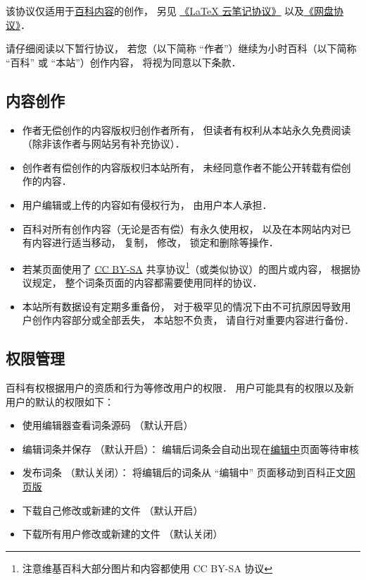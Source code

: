 
该协议仅适用于\href{http://wuli.wiki/online/}{百科内容}的创作， 另见 \href{http://wuli.wiki/online/NtLcns.html}{《LaTeX 云笔记协议》} 以及\href{http://www.example.com}{《网盘协议》}．

请仔细阅读以下暂行协议， 若您（以下简称 “作者”）继续为小时百科（以下简称 “百科” 或 “本站”）创作内容， 将视为同意以下条款．

\subsection{内容创作}
\begin{itemize}
\item 作者无偿创作的内容版权归创作者所有， 但读者有权利从本站永久免费阅读（除非该作者与网站另有补充协议）．
\item 创作者有偿创作的内容版权归本站所有， 未经同意作者不能公开转载有偿创作的内容．
\item 用户编辑或上传的内容如有侵权行为， 由用户本人承担．
\item 百科对所有创作内容（无论是否有偿）有永久使用权， 以及在本网站内对已有内容进行适当移动， 复制， 修改， 锁定和删除等操作．
\item 若某页面使用了 \href{https://creativecommons.org/licenses/by-sa/3.0/}{CC BY-SA} 共享协议\footnote{注意维基百科大部分图片和内容都使用 CC BY-SA 协议}（或类似协议）的图片或内容， 根据协议规定， 整个词条页面的内容都需要使用同样的协议．
\item 本站所有数据设有定期多重备份， 对于极罕见的情况下由不可抗原因导致用户创作内容部分或全部丢失， 本站恕不负责， 请自行对重要内容进行备份．
\end{itemize}

\subsection{权限管理}
百科有权根据用户的资质和行为等修改用户的权限． 用户可能具有的权限以及新用户的默认的权限如下：
\begin{itemize}
\item 使用编辑器查看词条源码 （默认开启）
\item 编辑词条并保存 （默认开启）： 编辑后词条会自动出现在\href{http://wuli.wiki/changed}{编辑中}页面等待审核
\item 发布词条 （默认关闭）： 将编辑后的词条从 “编辑中” 页面移动到百科正文\href{http://wuli.wiki/online}{网页版}
\item 下载自己修改或新建的文件 （默认开启）
\item 下载所有用户修改或新建的文件 （默认关闭）
\end{itemize}
